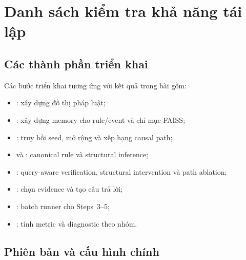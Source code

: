 \section{Danh sách kiểm tra khả năng tái lập}
\label{app:reproducibility}

\subsection{Các thành phần triển khai}

Các bước triển khai tương ứng với kết quả trong bài gồm:

\begin{itemize}
    \item {}: xây dựng đồ thị pháp luật;
    \item {}: xây dựng memory cho rule/event và
    chỉ mục FAISS;
    \item {}: truy hồi seed, mở rộng và
    xếp hạng causal path;
    \item {} và
    : canonical rule và structural inference;
    \item {}: query-aware verification,
    structural intervention và path ablation;
    \item {}: chọn evidence và tạo câu trả lời;
    \item {}: batch runner cho
    Steps~3--5;
    \item {}: tính metric và diagnostic
    theo nhóm.
\end{itemize}

\subsection{Phiên bản và cấu hình chính}

